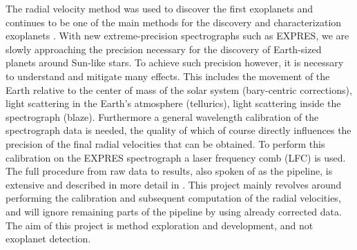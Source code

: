 The radial velocity method was used to discover the first exoplanets and continues to be one of the main methods for the discovery and characterization exoplanets \cite{radial_velocity_techniques}. With new extreme-precision spectrographs such as EXPRES, we are slowly approaching the precision necessary for the discovery of Earth-sized planets around Sun-like stars. To achieve such precision however, it is necessary to understand and mitigate many effects. This includes the movement of the Earth relative to the center of mass of the solar system (bary-centric corrections), light scattering in the Earth's atmosphere (tellurics), light scattering inside the spectrograph (blaze). Furthermore a general wavelength calibration of the spectrograph data is needed, the quality of which of course directly influences the precision of the final radial velocities that can be obtained. To perform this calibration on the EXPRES spectrograph a laser frequency comb (LFC) is used. The full procedure from raw data to results, also spoken of as the pipeline, is extensive and described in more detail in \cite{first_RV_from_EXPRES}. This project mainly revolves around performing the calibration and subsequent computation of the radial velocities, and will ignore remaining parts of the pipeline by using already corrected data. The aim of this project is method exploration and development, and not exoplanet detection.



